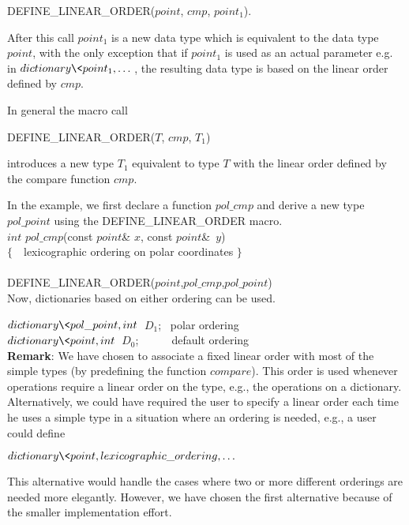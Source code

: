 \begin{center}
DEFINE\_LINEAR\_ORDER($point$, $cmp$, $point_1$). 
\end{center}

\smallskip
After this call $point_1$ is a new data type which is equivalent to the data 
type $point$, with the only exception that if $point_1$ is used as an actual 
parameter e.g. in $dictionary\<point_1,\dots\>$, the resulting data type 
is based on the linear order defined by $cmp$.

In general the macro call

\begin{center}
DEFINE\_LINEAR\_ORDER($T$, $cmp$, $T_1$)  
\end{center}

introduces a new type $T_1$ equivalent to type $T$ with the linear order
defined by the compare function $cmp$.

In the example, we first declare a function $pol\_cmp$ and derive a new type
$pol\_point$ using the DEFINE\_LINEAR\_ORDER macro.\\
\smallskip
$int$  $pol\_cmp$(const $point$\& $x$, const $point$\&\ $y$)\\
$\{$\ \ \co lexicographic ordering on polar coordinates  $\}$\\
\\
DEFINE\_LINEAR\_ORDER($point$,$pol\_cmp$,$pol\_point$)\\

Now, dictionaries based on either ordering can be used.

\smallskip
$dictionary\<pol\_point,int\>$ $D_1$; \ \co polar ordering\\
\smallskip
$dictionary\<point,int\>$ $D_0$;\ \ \ \ \ \ \co default ordering\\

{\bf Remark}: We have chosen to associate a fixed linear order with most of
the simple types (by predefining the function $compare$). This order is used
whenever operations require a linear order on the type, e.g., the operations
on a dictionary. Alternatively, we could have required the user to specify a
linear order each time he uses a simple type in a situation where an ordering
is needed, e.g., a user could define

\quad\quad\quad $dictionary\<point,lexicographic\_ordering,\dots\>$

This alternative would handle the cases where two or more different orderings
are needed more elegantly. However, we have chosen the first alternative
because of the smaller implementation effort.

